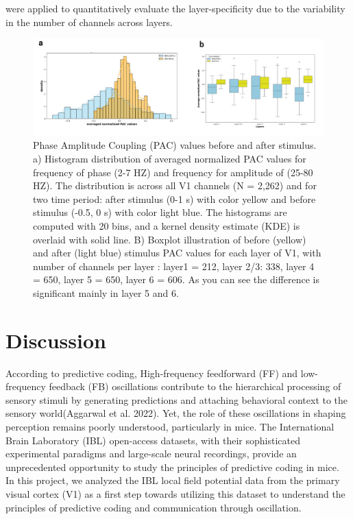 \documentclass[
  letterpaper,
  DIV=11,
  numbers=noendperiod]{scrartcl}
\begin{document}
were applied to quantitatively evaluate the layer-specificity due to the
variability in the number of channels across layers.

\begin{figure}[H]

{\centering \includegraphics{images/pac_beforeVSafter.png}

}

\caption{Phase Amplitude Coupling (PAC) values before and after
stimulus. a) Histogram distribution of averaged normalized PAC values
for frequency of phase (2-7 HZ) and frequency for amplitude of (25-80
HZ). The distribution is across all V1 channels (N = 2,262) and for two
time period: after stimulus (0-1 s) with color yellow and before
stimulus (-0.5, 0 s) with color light blue. The histograms are computed
with 20 bins, and a kernel density estimate (KDE) is overlaid with solid
line. B) Boxplot illustration of before (yellow) and after (light blue)
stimulus PAC values for each layer of V1, with number of channels per
layer : layer1 = 212, layer 2/3: 338, layer 4 = 650, layer 5 = 650,
layer 6 = 606. As you can see the difference is significant mainly in
layer 5 and 6.}

\end{figure}%

\section{Discussion}\label{discussion}

According to predictive coding, High-frequency feedforward (FF) and
low-frequency feedback (FB) oscillations contribute to the hierarchical
processing of sensory stimuli by generating predictions and attaching
behavioral context to the sensory world(Aggarwal et al. 2022). Yet, the
role of these oscillations in shaping perception remains poorly
understood, particularly in mice. The International Brain Laboratory
(IBL) open-access datasets, with their sophisticated experimental
paradigms and large-scale neural recordings, provide an unprecedented
opportunity to study the principles of predictive coding in mice. In
this project, we analyzed the IBL local field potential data from the
primary visual cortex (V1) as a first step towards utilizing this
dataset to understand the principles of predictive coding and
communication through oscillation.
\end{document}
